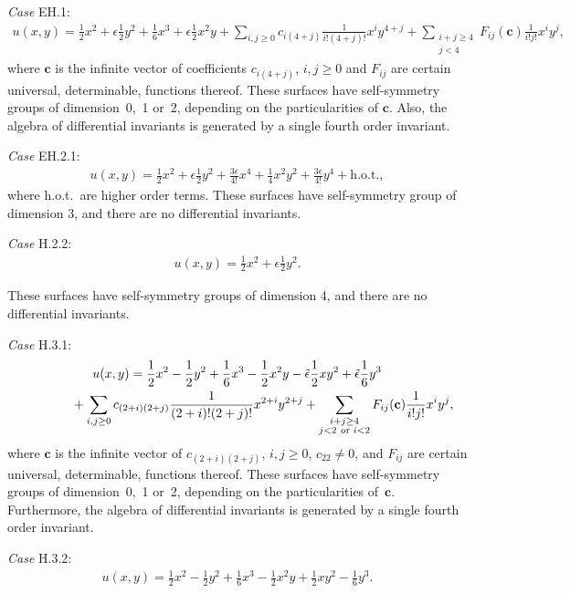 \documentclass[pdftex]{sigma}%
\numberwithin{equation}{section}
\begin{document}
{\it Case} EH.1:
\begin{gather*}
u(x,y)=\frac{1}{2}x^2+\epsilon\frac{1}{2}y^2+\frac{1}{6}x^3+\epsilon\frac{1}{2}x^2y
+\sum_{i,j\geq 0}c_{i(4+j)}\frac{1}{i!(4+j)!}x^iy^{4+j}
+\sum_{\substack{ i+j\geq 4 \\ j<4}}F_{ij}(\mathbf{c})\frac{1}{i!j!}x^iy^j,
\end{gather*}
where $\mathbf{c}$ is the infinite vector of coefficients $c_{i(4+j)}$, $i,j\geq0$ and $F_{ij}$ are certain universal, determinable, functions thereof. These surfaces have self-symmetry groups of dimension~0,~1 or~2, depending on the particularities of $\mathbf{c}$. Also, the algebra of differential invariants is generated by a single fourth order invariant.

{\it Case} EH.2.1:
\begin{gather*}
u(x,y)=\frac{1}{2}x^2+\epsilon\frac{1}{2}y^2+\frac{3\epsilon}{4!}x^4
+\frac{1}{4}x^2y^2+\frac{3\epsilon}{4!}y^4+ \text{h.o.t.},
\end{gather*}
where h.o.t.\ are higher order terms. These surfaces have self-symmetry group of dimension 3, and there are no differential invariants.

{\it Case} H.2.2:
\begin{gather*}
u(x,y)=\frac{1}{2}x^2+\epsilon\frac{1}{2}y^2.
\end{gather*}

These surfaces have self-symmetry groups of dimension 4, and there are no differential inva\-riants.

{\it Case} H.3.1:
\begin{gather*}
u(x,y)=\frac{1}{2}x^2-\frac{1}{2}y^2+\frac{1}{6}x^3-\frac{1}{2}x^2y -\tilde{\epsilon}\frac{1}{2}xy^2+\tilde{\epsilon}\frac{1}{6}y^3
\\ \hphantom{u(x,y)=}
{}+\sum_{i,j\geq 0}c_{(2+i)(2+j)}\frac{1}{(2+i)!(2+j)!}x^{2+i}y^{2+j}
+\sum_{\substack{ i+j\geq 4 \\ j<2~\text{or } i<2}}F_{ij}(\mathbf{c})\frac{1}{i!j!}x^iy^j,
\end{gather*}
where $\mathbf{c}$ is the infinite vector of $c_{(2+i)(2+j)}$, $i,j\geq0$, $c_{22}\neq0$, and $F_{ij}$ are certain universal, determinable, functions thereof. These surfaces have self-symmetry groups of dimension~0,~1 or~2, depending on the particularities of~$\mathbf{c}$. Furthermore, the algebra of differential invariants is generated by a single fourth order invariant.

{\it Case} H.3.2:
\begin{gather*}
u(x,y)=\frac{1}{2}x^2-\frac{1}{2}y^2+\frac{1}{6}x^3-\frac{1}{2}x^2y+\frac{1}{2}xy^2-\frac{1}{6}y^3.
\end{gather*}
\end{document}

